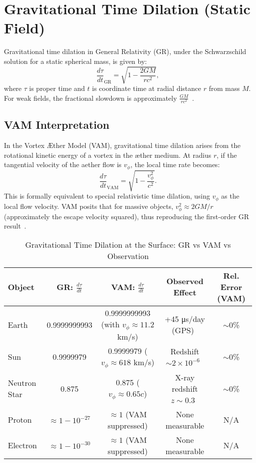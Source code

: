 \section{Gravitational Time Dilation (Static Field)}

Gravitational time dilation in General Relativity (GR), under the Schwarzschild solution for a static spherical mass, is given by:
\[
    \frac{d\tau}{dt}_{\text{GR}} = \sqrt{1 - \frac{2GM}{rc^2}},
\]
where $\tau$ is proper time and $t$ is coordinate time at radial distance $r$ from mass $M$. For weak fields, the fractional slowdown is approximately $\frac{GM}{rc^2}$~\cite{will2014confrontation}.

\subsection*{VAM Interpretation}
In the Vortex Æther Model (VAM), gravitational time dilation arises from the rotational kinetic energy of a vortex in the æther medium. At radius $r$, if the tangential velocity of the aether flow is $v_\phi$, the local time rate becomes:
\[
    \frac{d\tau}{dt}_{\text{VAM}} = \sqrt{1 - \frac{v_\phi^2}{c^2}}.
\]
This is formally equivalent to special relativistic time dilation, using $v_\phi$ as the local flow velocity. VAM posits that for massive objects, $v_\phi^2 \approx 2GM/r$ (approximately the escape velocity squared), thus reproducing the first-order GR result~\cite{iskandarani2025VAM2}.

\begin{table}[h]
    \centering
    \caption{Gravitational Time Dilation at the Surface: GR vs VAM vs Observation}
    \begin{tabular}{|l|c|c|c|c|}
        \hline
        \textbf{Object} & \textbf{GR: $\frac{d\tau}{dt}$} & \textbf{VAM: $\frac{d\tau}{dt}$} & \textbf{Observed Effect} & \textbf{Rel. Error (VAM)} \\
        \hline
        Earth & 0.9999999993 & 0.9999999993 (with $v_\phi\approx 11.2$ km/s) & +45 μs/day (GPS)~\cite{ashby2003relativity} & $\sim$0\% \\
        Sun & 0.9999979 & 0.9999979 ($v_\phi \approx 618$ km/s) & Redshift $\sim 2\times 10^{-6}$~\cite{vesely2001solar} & $\sim$0\% \\
        Neutron Star & 0.875 & 0.875 ($v_\phi \approx 0.65c$) & X-ray redshift $z\sim 0.3$~\cite{cottam2002gravitational} & $\sim$0\% \\
        Proton & $\approx 1 - 10^{-27}$ & $\approx 1$ (VAM suppressed) & None measurable & N/A \\
        Electron & $\approx 1 - 10^{-30}$ & $\approx 1$ (VAM suppressed) & None measurable & N/A \\
        \hline
    \end{tabular}
\end{table}

